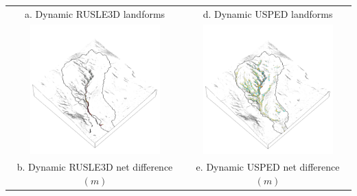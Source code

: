 \documentclass{standalone}
\begin{document}
\begin{tabular}{m{} m{}}
\multicolumn{1}{c}{a. Dynamic RUSLE3D landforms} &
\multicolumn{1}{c}{d. Dynamic USPED landforms}\\
%
\multicolumn{1}{c}{\includegraphics[height=50mm]{../../images/rusle_3d/difference.png}} &
\multicolumn{1}{c}{\includegraphics[height=50mm]{../../images/usped_3d/difference.png}}\\
\multicolumn{1}{c}{b. Dynamic RUSLE3D net difference $(m)$} & 
\multicolumn{1}{c}{e. Dynamic USPED net difference $(m)$}\\

%
\end{tabular}

\end{document}

